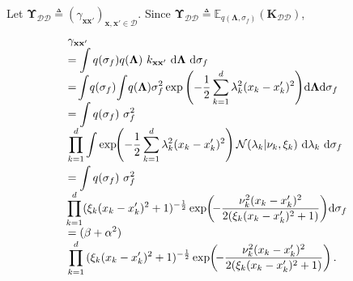 \documentclass[conference]{IEEEtran}
\begin{document}
	\vspace{-0mm}
	Let $\mathbf{\Upsilon}_\mathcal{DD}\triangleq (\gamma_{\mathbf{x}\mathbf{x}'})_{\mathbf{x},\mathbf{x}'\in\mathcal{D}}$. Since $\mathbf{\Upsilon}_\mathcal{DD}\triangleq\mathbb{E}_{q(\mathbf{\Lambda},\sigma_f)}(\mathbf{K}_{\mathcal{DD}})$,
	\vspace{-2mm}
	\begin{equation*}
		\hspace{-1.7mm}
		\begin{array}{l}
			\gamma_{\mathbf{x}\mathbf{x}'}\\
			\displaystyle=\int q(\sigma_f)q(\mathbf{\Lambda})\ k_{\mathbf{x}\mathbf{x}'}\ \mathrm{d}\mathbf{\Lambda}\ \mathrm{d}\sigma_f \vspace{-1mm}\\
			\displaystyle=\hspace{-0.5mm}\int\hspace{-0.5mm} q(\sigma_f)\hspace{-0.5mm}\int \hspace{-0.5mm}q(\mathbf{\Lambda})\sigma_f^2 \exp\left(-\dfrac{1}{2}\sum_{k=1}^{d}\lambda_k^2(x_{k}-x'_{k})^2\right)\hspace{-0.5mm} \mathrm{d}\mathbf{\Lambda} \mathrm{d}\sigma_f \vspace{-1mm}\\
			\displaystyle=\int q(\sigma_f)\ \sigma_f^2\\
			\displaystyle\prod_{k=1}^{d}\int \exp\hspace{-1mm}\left(-\dfrac{1}{2}\sum_{k=1}^{d}\lambda_k^2(x_{k}-x'_{k})^2\right)\mathcal{N}(\lambda_k|\nu_k,\xi_k)\ \mathrm{d}\lambda_k\  \mathrm{d}\sigma_f   \vspace{1mm}\\
			\displaystyle = \int q(\sigma_f)\ \sigma_f^2\\
			\displaystyle\hspace{-0.5mm}\prod_{k=1}^{d}\hspace{-0.5mm}{(\xi_k(x_{k}-x'_{k})^2+1)^{-\frac{1}{2}}}\exp\hspace{-0.7mm}\left(\hspace{-0.7mm}-\frac{\nu_k^2(x_{k}-x'_{k})^2}{2(\xi_k(x_{k}-x'_{k})^2+1)}\right)\hspace{-0.5mm}\mathrm{d}\sigma_f \\
			=\displaystyle (\beta+\alpha^2)\\
			\displaystyle\prod_{k=1}^{d}{(\xi_k(x_{k}-x'_{k})^2+1)^{-\frac{1}{2}}}\exp\hspace{-0.7mm}\left(\hspace{-0.7mm}-\frac{\nu_k^2(x_{k}-x'_{k})^2}{2(\xi_k(x_{k}-x'_{k})^2+1)}\right).
		\end{array}
	\end{equation*}
%
%
%
%
%
%
\end{document}
